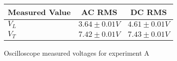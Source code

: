 \begin{figure}[H]    \centering    \begin{tabular}{|l|c|c|}
        \hline
        Measured Value & AC RMS & DC RMS \\
        \hline
        $V_L$ & $3.64\pm 0.01\unit{V}$ & $4.61\pm 0.01\unit{V}$ \\
        $V_T$ & $7.42\pm 0.01\unit{V}$ & $7.43\pm 0.01\unit{V}$ \\
        \hline
    \end{tabular}    \caption{Oscilloscope measured voltages for experiment A}\end{figure}